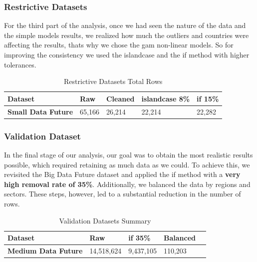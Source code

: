 \documentclass[11pt,english,a4paper,hidelinks]{book}
\begin{document}
\subsubsection{Restrictive Datasets}
\noindent For the third part of the analysis, once we had seen the nature of the data and the simple models results, we realized how much the outliers and countries were affecting the results, thats why we chose the \acrshort{gam} non-linear models. So for improving the consistency we used the \acrshort{islandcase} and the \acrshort{if} method with higher tolerances.


\begin{table}[H]
    \centering
    \begin{tabular}{|l|l|l|l|l|}
        \hline  
        \textbf{Dataset} & \textbf{Raw} & \textbf{Cleaned} & \textbf{ \acrshort{islandcase} 8\%} & \textbf{ \acrshort{if} 15\%} \\
        \hline
        \textbf{Small Data Future} & 65,166 & 26,214 & 22,214 & 22,282 \\
        \hline
        \end{tabular}

    \caption{Restrictive Datasets Total Rows}
    \label{tab:restrictive_datasets_rows}
\end{table}

\subsubsection{Validation Dataset}

\noindent In the final stage of our analysis, our goal was to obtain the most realistic results possible, which required retaining as much data as we could. To achieve this, we revisited the Big Data Future dataset and applied the \acrshort{if} method with a \textbf{very high removal rate of 35\%}. Additionally, we balanced the data by regions and sectors. These steps, however, led to a substantial reduction in the number of rows.

\begin{table}[H]
    \centering
    \begin{tabular}{|l|l|l|l|l|}
        \hline  
        \textbf{Dataset} & \textbf{Raw} & \textbf{ \acrshort{if} 35\%} & \textbf{{Balanced}} \\
        \hline
        \textbf{Medium Data Future} & 14,518,624 & 9,437,105 & 110,203 \\
        \hline
        \end{tabular}

    \caption{Validation Datasets Summary}
    \label{tab:validation_datasets_summary}
\end{table}
\end{document}
